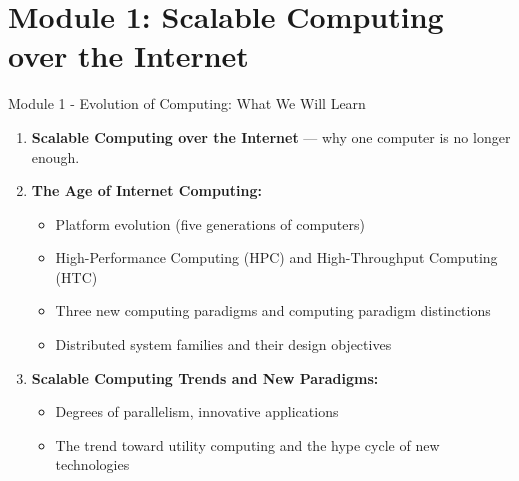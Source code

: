 
\section{Module 1: Scalable Computing over the Internet}

\begin{frame}{Module 1 - Evolution of Computing: What We Will Learn}
\begin{enumerate}
\item<1-> \textbf{Scalable Computing over the Internet} --- why one computer is no longer enough.
\item<2-> \textbf{The Age of Internet Computing:}
    \begin{itemize}
    \item Platform evolution (five generations of computers)
    \item High-Performance Computing (HPC) and High-Throughput Computing (HTC)
    \item Three new computing paradigms and computing paradigm distinctions
    \item Distributed system families and their design objectives
    \end{itemize}
\item<3-> \textbf{Scalable Computing Trends and New Paradigms:}
    \begin{itemize}
    \item Degrees of parallelism, innovative applications
    \item The trend toward utility computing and the hype cycle of new technologies
    \end{itemize}
\end{enumerate}
\end{frame}

